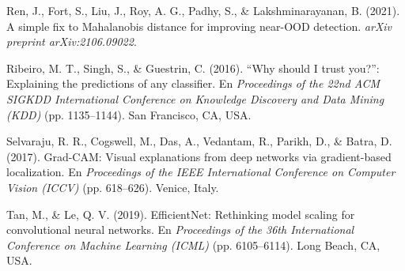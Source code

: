 \documentclass[12pt,letterpaper]{article}
\begin{document}
\par\bigskip
\noindent\hangindent=1.27cm
Ren, J., Fort, S., Liu, J., Roy, A. G., Padhy, S., \& Lakshminarayanan, B. (2021). A simple fix to Mahalanobis distance for improving near-OOD detection. \textit{arXiv preprint arXiv:2106.09022}.

\par\bigskip
\noindent\hangindent=1.27cm
Ribeiro, M. T., Singh, S., \& Guestrin, C. (2016). ``Why should I trust you?'': Explaining the predictions of any classifier. En \textit{Proceedings of the 22nd ACM SIGKDD International Conference on Knowledge Discovery and Data Mining (KDD)} (pp. 1135--1144). San Francisco, CA, USA.

\par\bigskip
\noindent\hangindent=1.27cm
Selvaraju, R. R., Cogswell, M., Das, A., Vedantam, R., Parikh, D., \& Batra, D. (2017). Grad-CAM: Visual explanations from deep networks via gradient-based localization. En \textit{Proceedings of the IEEE International Conference on Computer Vision (ICCV)} (pp. 618--626). Venice, Italy.

\par\bigskip
\noindent\hangindent=1.27cm
Tan, M., \& Le, Q. V. (2019). EfficientNet: Rethinking model scaling for convolutional neural networks. En \textit{Proceedings of the 36th International Conference on Machine Learning (ICML)} (pp. 6105--6114). Long Beach, CA, USA.

\newpage
\end{document}
